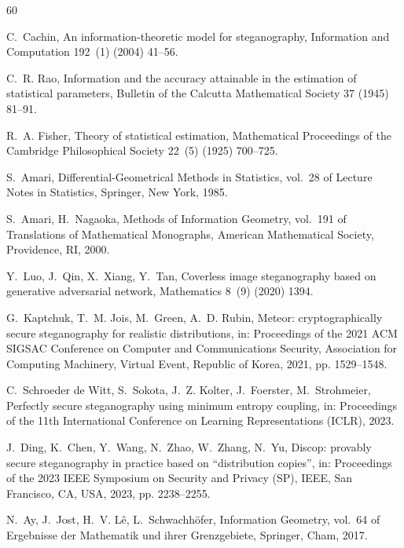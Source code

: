 \documentclass[a4paper,fleqn]{cas-dc}
\begin{document}
%
\begin{thebibliography}{60}

C.~Cachin, An information-theoretic model for steganography, Information and Computation 192~(1) (2004) 41--56.

C.~R. Rao, Information and the accuracy attainable in the estimation of statistical parameters, Bulletin of the Calcutta Mathematical Society 37 (1945) 81--91.

R.~A. Fisher, Theory of statistical estimation, Mathematical Proceedings of the Cambridge Philosophical Society 22~(5) (1925) 700--725.

S.~Amari, Differential-Geometrical Methods in Statistics, vol.~28 of Lecture Notes in Statistics, Springer, New York, 1985.

S.~Amari, H.~Nagaoka, Methods of Information Geometry, vol.~191 of Translations of Mathematical Monographs, American Mathematical Society, Providence, RI, 2000.

Y.~Luo, J.~Qin, X.~Xiang, Y.~Tan, Coverless image steganography based on generative adversarial network, Mathematics 8~(9) (2020) 1394.

G.~Kaptchuk, T.~M. Jois, M.~Green, A.~D. Rubin, Meteor: cryptographically secure steganography for realistic distributions, in: Proceedings of the 2021 ACM SIGSAC Conference on Computer and Communications Security, Association for Computing Machinery, Virtual Event, Republic of Korea, 2021, pp. 1529--1548.

C.~Schroeder de Witt, S.~Sokota, J.~Z. Kolter, J.~Foerster, M.~Strohmeier, Perfectly secure steganography using minimum entropy coupling, in: Proceedings of the 11th International Conference on Learning Representations (ICLR), 2023.

J.~Ding, K.~Chen, Y.~Wang, N.~Zhao, W.~Zhang, N.~Yu, Discop: provably secure steganography in practice based on ``distribution copies'', in: Proceedings of the 2023 IEEE Symposium on Security and Privacy (SP), IEEE, San Francisco, CA, USA, 2023, pp. 2238--2255.

N.~Ay, J.~Jost, H.~V. L\^{e}, L.~Schwachh{\"o}fer, Information Geometry, vol.~64 of Ergebnisse der Mathematik und ihrer Grenzgebiete, Springer, Cham, 2017.


\end{thebibliography}
\end{document}
